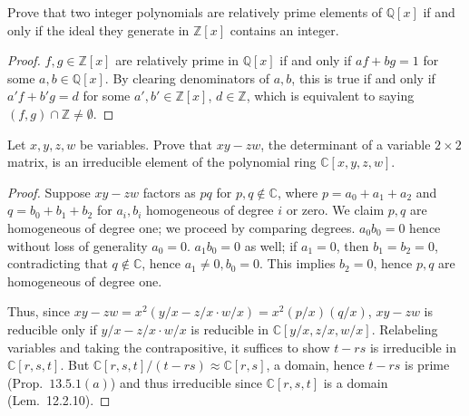 \documentclass[12pt]{article}
\theoremstyle{remark}
\begin{document}
\begin{problem}
  Prove that two integer polynomials are relatively prime elements of $\mathbb{Q}[x]$ if and only if the ideal they generate in $\mathbb{Z}[x]$ contains an integer.
\end{problem}
\begin{proof}
  $f,g \in \mathbb{Z}[x]$ are relatively prime in $\mathbb{Q}[x]$ if and only if $af + bg = 1$ for some $a,b \in \mathbb{Q}[x]$. By clearing denominators of $a,b$, this is true if and only if $a'f + b'g = d$ for some $a',b' \in \mathbb{Z}[x]$, $d \in \mathbb{Z}$, which is equivalent to saying $(f,g) \cap \mathbb{Z} \ne \emptyset$.
\end{proof}

\setcounter{subsubsection}{3}
\begin{problem}
  Let $x,y,z,w$ be variables. Prove that $xy-zw$, the determinant of a variable $2\times2$ matrix, is an irreducible element of the polynomial ring $\mathbb{C}[x,y,z,w]$.
\end{problem}
\begin{proof}
  Suppose $xy-zw$ factors as $pq$ for $p,q \notin \mathbb{C}$, where $p=a_0+a_1+a_2$ and $q=b_0+b_1+b_2$ for $a_i,b_i$ homogeneous of degree $i$ or zero. We claim $p,q$ are homogeneous of degree one; we proceed by comparing degrees. $a_0b_0 = 0$ hence without loss of generality $a_0 = 0$. $a_1b_0 = 0$ as well; if $a_1 = 0$, then $b_1 = b_2 = 0$, contradicting that $q \notin \mathbb{C}$, hence $a_1 \ne 0,b_0=0$. This implies $b_2 = 0$, hence $p,q$ are homogeneous of degree one.
  \par Thus, since $xy-zw = x^2(y/x - z/x \cdot w/x) = x^2(p/x)(q/x)$, $xy-zw$ is reducible only if $y/x - z/x \cdot w/x$ is reducible in $\mathbb{C}[y/x,z/x,w/x]$. Relabeling variables and taking the contrapositive, it suffices to show $t-rs$ is irreducible in $\mathbb{C}[r,s,t]$. But $\mathbb{C}[r,s,t]/(t-rs) \approx \mathbb{C}[r,s]$, a domain, hence $t-rs$ is prime (Prop.~$13.5.1(a)$) and thus irreducible since $\mathbb{C}[r,s,t]$ is a domain (Lem.~12.2.10).
\end{proof}
\end{document}
